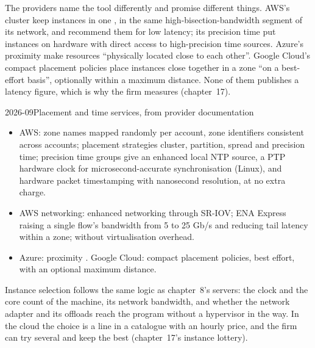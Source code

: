 The providers name the tool differently and promise different things. AWS's cluster  keep instances in one ,
in the same high-bisection-bandwidth segment of its network, and recommend them for low latency; its precision time  put
instances on hardware with direct access to high-precision time sources. Azure's proximity  make resources ``physically located
close to each other''. Google Cloud's compact placement policies place instances close together in a zone ``on a best-effort basis'', optionally
within a maximum distance. None of them publishes a latency figure, which is why the firm measures (chapter~17).

\begin{dated}{2026-09}{Placement and time services, from provider documentation}\label{dat:nw:trading-in-a-public-cloud:docs}
\begin{itemize}
\item AWS: zone names mapped randomly per account, zone identifiers consistent across accounts; placement strategies cluster, partition, spread and
  precision time; precision time groups give an enhanced local NTP source, a PTP hardware clock for microsecond-accurate synchronisation (Linux),
  and hardware packet timestamping with nanosecond resolution, at no extra charge.
\item AWS networking: enhanced networking through SR-IOV; ENA Express raising a single flow's bandwidth from 5 to 25 Gb/s and reducing tail
  latency within a zone;  without virtualisation overhead.
\item Azure: proximity . Google Cloud: compact placement policies, best effort, with an optional maximum distance.
\end{itemize}
\end{dated}

Instance selection follows the same logic as chapter~8's servers: the clock and the core count of the machine, its network bandwidth, and whether
the network adapter and its offloads reach the program without a hypervisor in the way. In the cloud the choice is a line in a catalogue with an
hourly price, and the firm can try several and keep the best (chapter~17's instance lottery).

